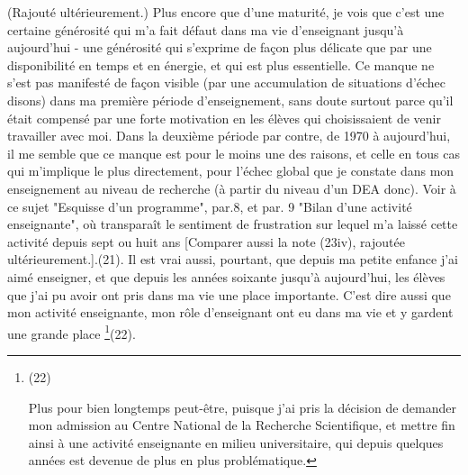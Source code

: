 {(Rajouté ultérieurement.) Plus encore que d'une maturité, je vois que c'est une certaine générosité qui m'a fait défaut dans ma vie d'enseignant jusqu'à aujourd'hui - une générosité qui s'exprime de façon plus délicate que par une disponibilité en temps et en énergie, et qui est plus essentielle. Ce manque ne s'est pas manifesté de façon visible (par une accumulation de situations d'échec disons) dans ma première période d'enseignement, sans doute surtout parce qu'il était compensé par une forte motivation en les élèves qui choisissaient de venir travailler avec moi. Dans la deuxième période par contre, de 1970 à aujourd'hui, il me semble que ce manque est pour le moins une des raisons, et celle en tous cas qui m'implique le plus directement, pour l'échec global que je constate dans mon enseignement au niveau de recherche (à partir du niveau d'un DEA donc). Voir à ce sujet "Esquisse d'un programme", par.8, et par. 9 "Bilan d'une activité enseignante", où transparaît le sentiment de frustration sur lequel m'a laissé cette activité depuis sept ou huit ans [Comparer aussi la note (23iv), rajoutée ultérieurement.].}(21). Il est vrai aussi, pourtant, que depuis ma petite enfance j'ai aimé enseigner, et que depuis les années soixante jusqu'à aujourd'hui, les élèves que j'ai pu avoir ont pris dans ma vie une place importante. C'est dire aussi que mon activité enseignante, mon rôle d'enseignant ont eu dans ma vie et y gardent une grande place \footnote{(22)\par Plus pour bien longtemps peut-être, puisque j'ai pris la décision de demander mon admission au Centre National de la Recherche Scientifique, et mettre fin ainsi à une activité enseignante en milieu universitaire, qui depuis quelques années est devenue de plus en plus problématique.}(22).

